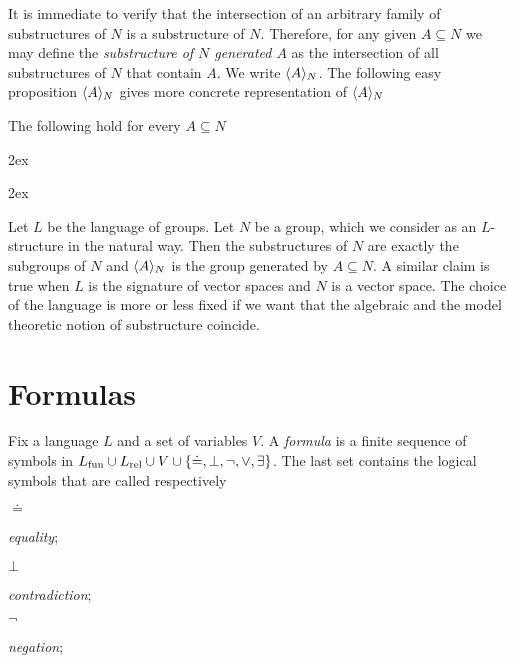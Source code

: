 It is immediate to verify that the intersection of an arbitrary family of substructures of $N$ is a substructure of $N$. Therefore, for any given $A\subseteq N$ we may define the \emph{substructure of $N$ generated $A$\/} as the intersection of all substructures of $N$ that contain $A$. We write \emph{$\langle A\rangle_N$}. The following easy proposition $\langle A\rangle_N$ gives more concrete representation of $\langle A\rangle_N$
%
\begin{lemma}\label{strutturagenerata}
The following hold for every $A\subseteq N$



\kern2ex

\kern2ex\QED

\begin{example}
Let $L$ be the language of groups. Let $N$ be a group, which we consider as an $L$-structure in the natural way. Then the substructures of $N$ are exactly the subgroups of $N$ and $\langle A\rangle_N$ is the group generated by $A\subseteq N$. A similar claim is true when $L$ is the signature of vector spaces and $N$ is a vector space. The choice of the language is more or less fixed if we want that the algebraic and the model theoretic notion of substructure coincide.\QED
\end{example}
\end{lemma}


\section{Formulas}\label{sintassformule}


Fix a language $L$ and a set of variables $V$. A \emph{formula} is a finite sequence of symbols in $L_{\rm fun}\cup L_{\rm rel}\cup V\cup \{\doteq,\bot,\neg,\vee,\exists\}$. The last set contains the logical symbols that are called respectively


\def\medrel#1{\parbox[t]{4ex}{#1}}
\def\ceq#1#2{\medrel{#1}{\parbox{25ex}{#2}}}


\ceq{$\doteq$}{\emph{equality};}\ceq{$\bot$}{\emph{contradiction};}\ceq{$\neg$}{\emph{negation};}

